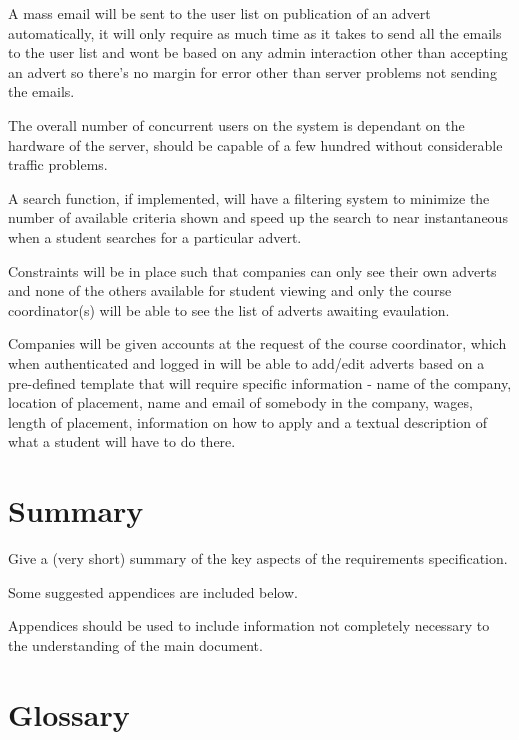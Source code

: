 \documentclass{l3deliverable}
\begin{document}
A mass email will be sent to the user list on publication of an advert automatically, it will only require as much time as it takes to send all the emails to the user list and wont be based on any admin interaction other than accepting an advert so there's no margin for error other than server problems not sending the emails.

The overall number of concurrent users on the system is dependant on the hardware of the server, should be capable of a few hundred without considerable traffic problems.

A search function, if implemented, will have a filtering system to minimize the number of available criteria shown and speed up the search to near instantaneous when a student searches for a particular advert.

Constraints will be in place such that companies can only see their own adverts and none of the others available for student viewing and only the course coordinator(s) will be able to see the list of adverts awaiting evaulation.

Companies will be given accounts at the request of the course coordinator, which when authenticated and logged in will be able to add/edit adverts based on a pre-defined template that will require specific information - name of the company, location of placement, name and email of somebody in the company, wages, length of placement, information on how to apply and a textual description of what a student will have to do there.


\section{Summary}

Give a (very short) summary of the key aspects of the requirements
specification.


\appendix

Some suggested appendices are included below.

Appendices should be used to include information not completely
necessary to the understanding of the main document.

\section{Glossary}
\end{document}
